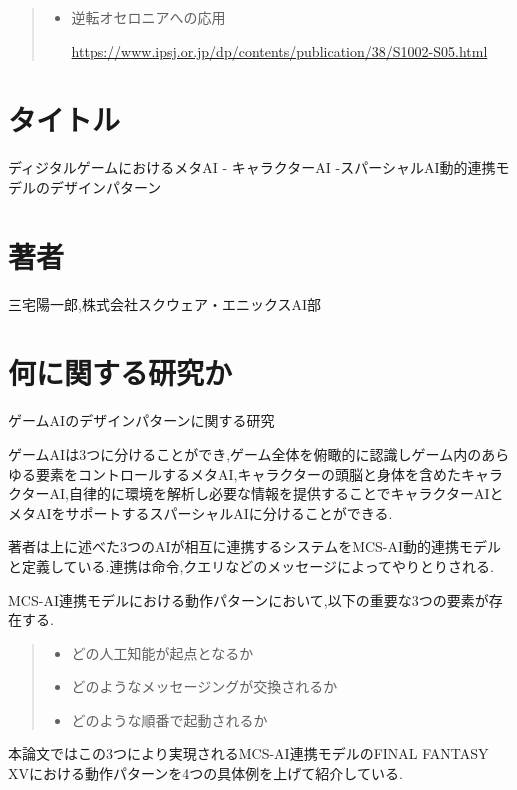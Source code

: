\documentclass{jarticle}     %
\begin{document}
\begin{quote}
  \begin{itemize}
   \item 逆転オセロニアへの応用\par
   \url{https://www.ipsj.or.jp/dp/contents/publication/38/S1002-S05.html}
  \end{itemize}
 \end{quote}


 \section*{タイトル}
 ディジタルゲームにおけるメタAI - キャラクターAI -スパーシャルAI動的連携モデルのデザインパターン\cite{2}

\section*{著者}
三宅陽一郎,株式会社スクウェア・エニックスAI部

\section*{何に関する研究か}
ゲームAIのデザインパターンに関する研究\par
ゲームAIは3つに分けることができ,ゲーム全体を俯瞰的に認識しゲーム内のあらゆる要素をコントロールするメタAI,キャラクターの頭脳と身体を含めたキャラクターAI,自律的に環境を解析し必要な情報を提供することでキャラクターAIとメタAIをサポートするスパーシャルAIに分けることができる.\par
著者は上に述べた3つのAIが相互に連携するシステムをMCS-AI動的連携モデルと定義している.連携は命令,クエリなどのメッセージによってやりとりされる.\par
MCS-AI連携モデルにおける動作パターンにおいて,以下の重要な3つの要素が存在する.

\begin{quote}
  \begin{itemize}
   \item どの人工知能が起点となるか
   \item どのようなメッセージングが交換されるか
   \item どのような順番で起動されるか
  \end{itemize}
 \end{quote}

 本論文ではこの3つにより実現されるMCS-AI連携モデルのFINAL FANTASY XVにおける動作パターンを4つの具体例を上げて紹介している.
\end{document}
